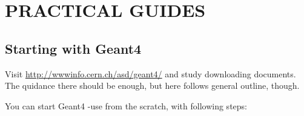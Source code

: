 \section{PRACTICAL GUIDES}

\subsection{Starting with {\sc Geant4}}
 
Visit \url{http://wwwinfo.cern.ch/asd/geant4/}
and study downloading documents. The quidance there should be enough, but here follows general outline, though.


You can start {\sc Geant4} -use from the scratch, with following steps:
 
